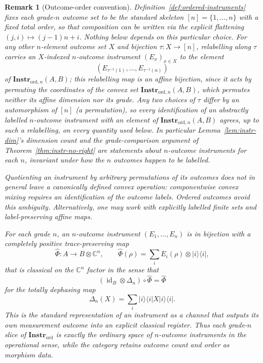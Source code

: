 \documentclass[11pt]{article}
\newtheorem{remark}[theorem]{Remark}
\DeclareMathOperator{\id}{id}
\begin{document}
\begin{remark}[Outcome-order convention]
\label{rem:outcome-order}
Definition~\ref{def:ordered-instruments} fixes each grade-$n$ outcome set to
be the standard skeleton $[n]=\{1,\dots,n\}$ with a fixed total order, so
that composition can be written via the explicit flattening
$(j,i)\mapsto(j-1)n+i$. Nothing below depends on this particular choice. For
any other $n$-element outcome set $X$ and bijection $\tau:X\to[n]$,
relabelling along $\tau$ carries an $X$-indexed $n$-outcome instrument
$(E_x)_{x\in X}$ to the element
\[
(E_{\tau^{-1}(1)},\dots,E_{\tau^{-1}(n)})
\]
of $\mathbf{Instr}_{\mathrm{ord},n}(A,B)$; this relabelling map is an affine
bijection, since it acts by permuting the coordinates of the convex set
$\mathbf{Instr}_{\mathrm{ord},n}(A,B)$, which permutes neither its affine
dimension nor its grade. Any two choices of $\tau$ differ by an automorphism
of $[n]$ (a permutation), so every identification of an abstractly labelled
$n$-outcome instrument with an element of
$\mathbf{Instr}_{\mathrm{ord},n}(A,B)$ agrees, up to such a relabelling, on
every quantity used below. In particular Lemma~\ref{lem:instr-dim}'s
dimension count and the grade-comparison argument of
Theorem~\ref{thm:instr-no-right} are statements about $n$-outcome
instruments for each $n$, invariant under how the $n$ outcomes happen to be
labelled.

Quotienting an instrument by arbitrary permutations of its outcomes does not
in general leave a canonically defined convex operation: componentwise convex
mixing requires an identification of the outcome labels. Ordered outcomes
avoid this ambiguity. Alternatively, one may work with explicitly labelled
finite sets and label-preserving affine maps.

For each grade $n$, an $n$-outcome instrument $(E_1,\dots,E_n)$ is in
bijection with a completely positive trace-preserving map
\[
\widehat\Phi:A\longrightarrow B\otimes\mathbb C^n,
\qquad
\widehat\Phi(\rho)=\sum_i E_i(\rho)\otimes |i\rangle\langle i|,
\]
that is classical on the $\mathbb C^n$ factor in the sense that
\[
(\id_B\otimes\Delta_n)\circ\widehat\Phi=\widehat\Phi
\]
for the totally dephasing map
\[
\Delta_n(X)=\sum_i |i\rangle\langle i|X|i\rangle\langle i|.
\]
This is the standard representation of an instrument as a channel that
outputs its own measurement outcome into an explicit classical register. Thus
each grade-$n$ slice of $\mathbf{Instr}_{\mathrm{ord}}$ is exactly the
ordinary space of $n$-outcome instruments in the operational sense, while the
category retains outcome count and order as morphism data.
\end{remark}
\end{document}
